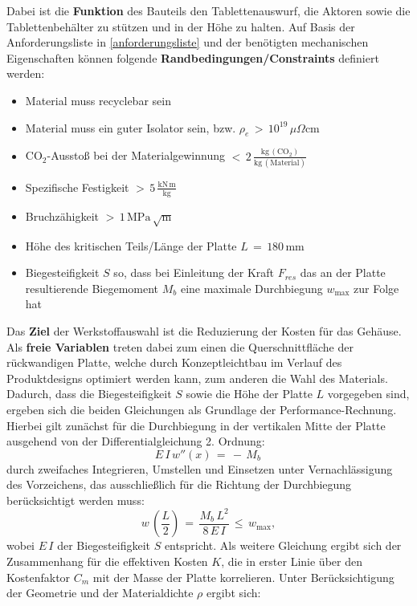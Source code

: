 Dabei ist die \textbf{Funktion} des Bauteils den Tablettenauswurf, die Aktoren sowie die Tablettenbehälter zu stützen und in der Höhe zu halten. Auf Basis der Anforderungsliste in \ref{anforderungsliste} und der benötigten mechanischen Eigenschaften können folgende \textbf{Randbedingungen/Constraints} definiert werden:
\begin{itemize}
	\item Material muss recyclebar sein
	\item Material muss ein guter Isolator sein, bzw. $\rho_e\,>\,10^{19}\,\mu\Omega$cm
	\item CO$_2$-Ausstoß bei der Materialgewinnung $<\,2\,\frac{\text{kg}\,(\text{CO}_2)}{\text{kg}\,(\text{Material})}$
	\item Spezifische Festigkeit $>\,5\,\frac{\text{kN}\,\text{m}}{\text{kg}}$
	\item Bruchzähigkeit $>\,1\,\text{MPa}\,\sqrt{\text{m}}$
	\item Höhe des kritischen Teils/Länge der Platte $L\,=\,180\,$mm
	\item Biegesteifigkeit $S$ so, dass bei Einleitung der Kraft $F_{res}$ das an der Platte resultierende Biegemoment $M_b$ eine maximale Durchbiegung $w_{\text{max}}$ zur Folge hat
\end{itemize}
Das \textbf{Ziel} der Werkstoffauswahl ist die Reduzierung der Kosten für das Gehäuse. Als \textbf{freie Variablen} treten dabei zum einen die Querschnittfläche der rückwandigen Platte, welche durch Konzeptleichtbau im Verlauf des Produktdesigns optimiert werden kann, zum anderen die Wahl des Materials.
Dadurch, dass die Biegesteifigkeit $S$ sowie die Höhe der Platte $L$ vorgegeben sind, ergeben sich die beiden Gleichungen als Grundlage der Performance-Rechnung. Hierbei gilt zunächst für die Durchbiegung in der vertikalen Mitte der Platte ausgehend von der Differentialgleichung 2. Ordnung:
\begin{equation}
	E\,I\,w''(x)\,=\,-\,M_b\,
\end{equation}
durch zweifaches Integrieren, Umstellen und Einsetzen unter Vernachlässigung des Vorzeichens, das ausschließlich für die Richtung der Durchbiegung berücksichtigt werden muss:
\begin{equation} \label{durchbiegung}
	w\,\left(\frac{L}{2}\right)\,=\,\frac{M_b \,L^2}{8\,E\,I}\,\le\,w_{\text{max}},
\end{equation}
wobei $E\,I$ der Biegesteifigkeit $S$ entspricht. Als weitere Gleichung ergibt sich der Zusammenhang für die effektiven Kosten $K$, die in erster Linie über den Kostenfaktor $C_m$ mit der Masse der Platte korrelieren. Unter Berücksichtigung der Geometrie und der Materialdichte $\rho$ ergibt sich:
